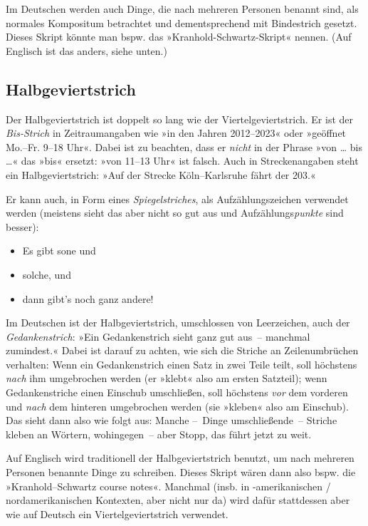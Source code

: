 Im Deutschen werden auch Dinge, die nach mehreren Personen benannt
sind, als normales Kompositum betrachtet und dementsprechend mit
Bindestrich gesetzt.  Dieses Skript könnte man bspw. das
»Kranhold-Schwartz-Skript« nennen.  (Auf Englisch ist das anders,
siehe unten.)

\subsection{Halbgeviertstrich}
\label{subsec:halbgeviert}
Der Halbgeviertstrich \Char{--} ist doppelt so lang wie der
Viertelgeviertstrich.  Er ist der \emph{Bis-Strich} in Zeitraumangaben
wie »in den Jahren 2012--2023« oder »geöffnet Mo.--Fr. 9--18 Uhr«.
Dabei ist zu beachten, dass er \emph{nicht} in der Phrase »von … bis
…« das »bis« ersetzt: »von 11--13 Uhr« ist falsch.  Auch in
Streckenangaben steht ein Halbgeviertstrich: »Auf der Strecke
Köln--Karlsruhe fährt der  203.«

Er kann auch, in Form eines \emph{Spiegelstriches}, als Aufzählungszeichen
verwendet werden (meistens sieht das aber nicht so gut aus und
Aufzählungs\emph{punkte} \Char{\textbullet} sind besser):
\begin{itemize}[label=--,nosep]
\item Es gibt sone und
\item solche, und
\item dann gibt's noch ganz andere!
\end{itemize}

Im Deutschen ist der Halbgeviertstrich, umschlossen von Leerzeichen,
auch der \emph{Gedankenstrich}: »Ein Gedankenstrich sieht ganz gut
aus~-- manchmal zumindest.«  Dabei ist darauf zu achten, wie sich die
Striche an Zeilenumbrüchen verhalten: Wenn ein Gedankenstrich einen
Satz in zwei Teile teilt, soll höchstens \emph{nach} ihm umgebrochen
werden (er »klebt« also am ersten Satzteil); wenn Gedankenstriche
einen Einschub umschließen, soll höchstens \emph{vor} dem vorderen und
\emph{nach} dem hinteren umgebrochen werden (sie »kleben« also am
Einschub).  Das sieht dann also wie folgt aus:  Manche --~Dinge
umschließende~-- Striche kleben an Wörtern, wohingegen~--
aber Stopp, das führt jetzt zu weit.

Auf Englisch wird traditionell der Halbgeviertstrich benutzt, um nach
mehreren Personen benannte Dinge zu schreiben.  Dieses Skript wären
dann also bspw. die »\foreignlanguage{british}{Kranhold--Schwartz
  course notes}«.  Manchmal (insb. in -amerikanischen /
nordamerikanischen Kontexten, aber nicht nur da) wird dafür
stattdessen aber wie auf Deutsch ein Viertelgeviertstrich verwendet.

